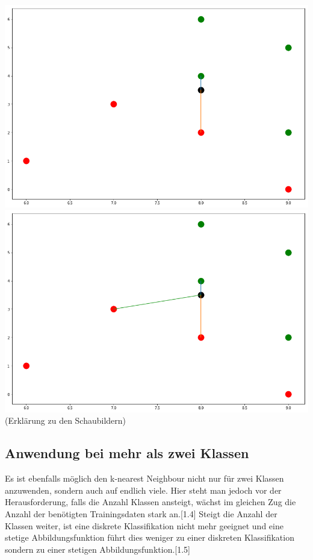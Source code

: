 \documentclass[a4paper]{scrartcl}
\begin{document}
\begin{multicols}{2}
                         \includegraphics[width=\linewidth]{knn3.png}
                         \includegraphics[width=\linewidth]{knn4.png}
                        (Erklärung zu den Schaubildern)
                        \subsection{Anwendung bei mehr als zwei Klassen}
                        Es ist ebenfalls möglich den k-nearest Neighbour nicht nur für zwei Klassen anzuwenden, sondern auch auf endlich viele. Hier steht man jedoch vor der Herausforderung, falls die Anzahl Klassen ansteigt, wächst im gleichen Zug die Anzahl der benötigten Trainingsdaten stark an.[1.4]
                        Steigt die Anzahl der Klassen weiter, ist eine diskrete Klassifikation nicht mehr geeignet und eine stetige Abbildungsfunktion   führt dies weniger zu einer diskreten Klassifikation sondern zu einer stetigen Abbildungsfunktion.[1.5]

\end{multicols}
\end{document}
